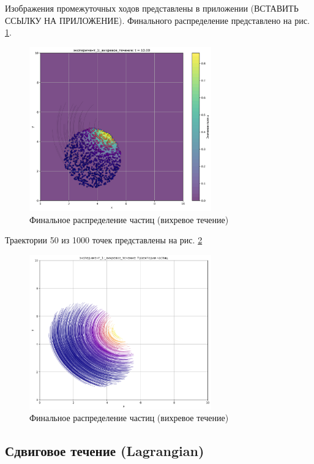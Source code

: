 Изображения промежуточных ходов представлены в приложении (ВСТАВИТЬ ССЫЛКУ НА ПРИЛОЖЕНИЕ).
Финального распределение представлено на рис. \ref{fig:lg_vortex_finall}.
\begin{figure}
	\centering
	\includegraphics[width=0.7\textwidth]{imgs/lg/эксперимент_1:_вихревое_течение_t10.00.png}
	\caption{Финальное распределение частиц (вихревое течение)}
	\label{fig:lg_vortex_finall}
\end{figure}
Траектории 50 из 1000 точек представлены на рис. \ref{fig:lg_vortex_tr}
\begin{figure}
	\centering
	\includegraphics[width=0.7\textwidth]{imgs/lg/эксперимент_1:_вихревое_течение_trajectories.png}
	\caption{Финальное распределение частиц (вихревое течение)}
	\label{fig:lg_vortex_tr}
\end{figure}

\newpage
\subsection{Сдвиговое течение (Lagrangian)}

